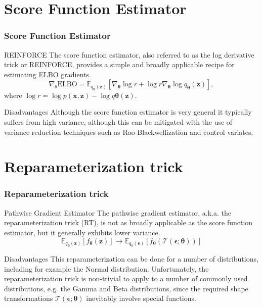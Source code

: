 \documentclass{beamer}
\begin{document}
\section{Score Function Estimator}
\begin{frame}
    \frametitle{Score Function Estimator}
    \begin{block}{REINFORCE}
        The score function estimator, also referred to as the log derivative trick or REINFORCE, provides a simple and broadly applicable recipe for estimating ELBO gradients.
        $$\nabla_\theta \text{ELBO} = \mathbb{E}_{q_\mathbf{\theta}(\mathbf{z})} \left[ \nabla_\mathbf{\theta} \log r + \log r \nabla_\mathbf{\theta} \log q_\mathbf{\theta}(\mathbf{z}) \right],$$
        where $\log r = \log p(\mathbf{x}, \mathbf{z}) − \log q\mathbf{θ}(\mathbf{z})$.
    \end{block}
    \begin{block}{Disadvantages}
        Although the score function estimator is very general it typically suffers from high variance, although this can be mitigated with the use of variance reduction techniques such as Rao-Blackwellization and control variates.
    \end{block}
\end{frame}

\section{Reparameterization trick}
\begin{frame}
    \frametitle{Reparameterization trick}
    \begin{block}{Pathwise Gradient Estimator}
        The pathwise gradient estimator, a.k.a. the reparameterization trick (RT), is not as broadly applicable as the score function estimator, but it generally exhibits lower variance.
        $$\mathbb{E}_{q_\mathbf{\theta}(\mathbf{z})} \left[ f_\mathbf{\theta}(\mathbf{z}) \right] \longrightarrow \mathbb{E}_{q_0(\mathbf{\epsilon})} \left[ f_\mathbf{\theta}(\mathcal{T}(\mathbf{\epsilon}; \mathbf{\theta})) \right]$$
    \end{block}
    \begin{block}{Disadvantages}
         This reparameterization can be done for a
number of distributions, including for example the Normal
distribution. Unfortunately, the reparameterization trick is
non-trivial to apply to a number of commonly used distributions, e.g. the Gamma and Beta distributions, since the
required shape transformations $\mathcal{T}(\mathbf{\epsilon}; \mathbf{\theta})$ inevitably involve
special functions.
    \end{block}
\end{frame}
\end{document}
